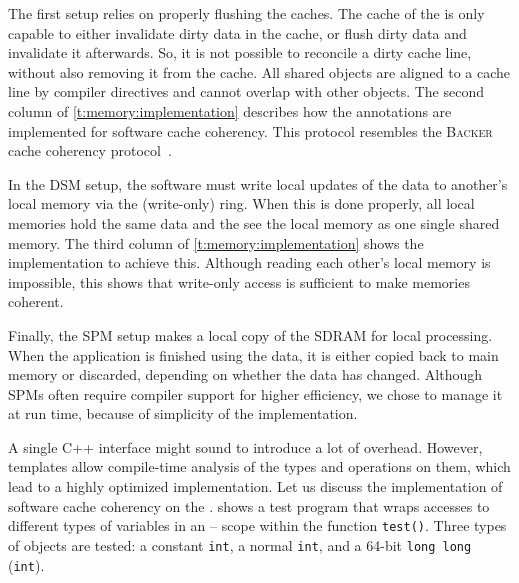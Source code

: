 The first setup relies on properly flushing the caches.
The cache of the \MicroBlaze* is only capable to either invalidate dirty data in the cache, or flush dirty data and invalidate it afterwards.
So, it is not possible to reconcile a dirty cache line, without also removing it from the cache.
All shared objects are aligned to a cache line by compiler directives and cannot overlap with other objects.
The second column of \cref{t:memory:implementation} describes how the annotations are implemented for software cache coherency.
This protocol resembles the \textsc{Backer} cache coherency protocol~\cite{blumofe:dag_consistency}.

In the \ac{DSM} setup, the software must write local updates of the data to another's local memory via the (write-only) ring.
When this is done properly, all local memories hold the same data and the \MicroBlazes see the local memory as one single shared memory.
The third column of \cref{t:memory:implementation} shows the implementation to achieve this.
Although reading each other's local memory is impossible, this shows that write-only access is sufficient to make memories coherent.

Finally, the \ac{SPM} setup makes a local copy of the \ac{SDRAM} for local processing.
When the application is finished using the data, it is either copied back to main memory or discarded, depending on whether the data has changed.
Although \acp{SPM} often require compiler support for higher efficiency, we chose to manage it at run time, because of simplicity of the implementation.

A single C++ interface might sound to introduce a lot of overhead.
However, templates allow compile-time analysis of the types and operations on them, which lead to a highly optimized implementation.
Let us discuss the implementation of software cache coherency on the \MicroBlaze.
 shows a test program that wraps accesses to different types of variables in an -- scope within the function \lstinline|test()|.
Three types of objects are tested: a constant \lstinline|int|, a normal \lstinline|int|, and a 64-bit \lstinline|long long| (\lstinline|int|).

